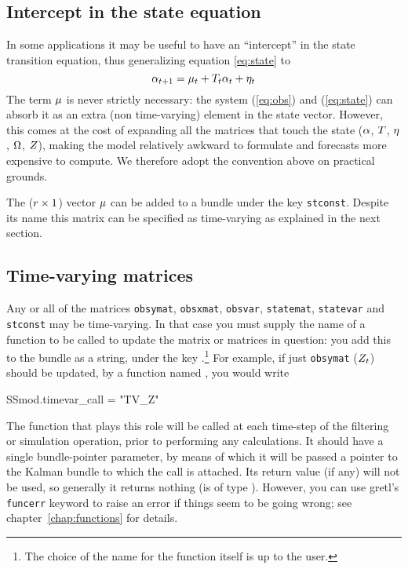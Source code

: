 \subsection{Intercept in the state equation}
\label{sec:stconst}

In some applications it may be useful to have an ``intercept'' in the
state transition equation, thus generalizing equation \eqref{eq:state}
to
\[
  \alpha_{t+1} = \mu_t + T_t \alpha_t + \eta_t \\
\]
The term $\mu$ is never strictly necessary: the system
(\ref{eq:obs}) and (\ref{eq:state}) can absorb it as an extra (non
time-varying) element in the state vector.  However, this comes at the
cost of expanding all the matrices that touch the state ($\alpha$,
$T$, $\eta$, $\Omega$, $Z$), making the model
relatively awkward to formulate and forecasts more expensive to
compute. We therefore adopt the convention above on practical grounds.

The ($r \times 1$) vector $\mu$ can be added to a bundle
under the key \texttt{stconst}. Despite its name this matrix can be
specified as time-varying as explained in the next section.

\subsection{Time-varying matrices}
\label{sec:tvarying}

Any or all of the matrices \texttt{obsymat}, \texttt{obsxmat},
\texttt{obsvar}, \texttt{statemat}, \texttt{statevar} and
\texttt{stconst} may be time-varying.  In that case you must supply
the name of a function to be called to update the matrix or matrices
in question: you add this to the bundle as a string, under the key
.\footnote{The choice of the name for the function
  itself is up to the user.} For example, if just \texttt{obsymat}
($Z_t$) should be updated, by a function named , you
would write
%
\begin{code}
SSmod.timevar_call = "TV_Z"
\end{code}
%
The function that plays this role will be called at each time-step of
the filtering or simulation operation, prior to performing any
calculations. It should have a single bundle-pointer parameter, by
means of which it will be passed a pointer to the Kalman bundle to
which the call is attached.  Its return value (if any) will not be
used, so generally it returns nothing (is of type ).
However, you can use gretl's \texttt{funcerr} keyword to raise an
error if things seem to be going wrong; see
chapter~\ref{chap:functions} for details.

